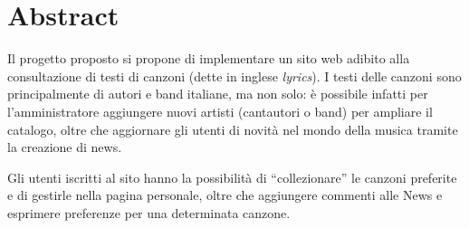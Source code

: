 \section{Abstract}
Il progetto proposto si propone di implementare un sito web adibito alla consultazione di testi di canzoni (dette in inglese \textit{lyrics}).
I testi delle canzoni sono principalmente di autori e band italiane, ma non solo: \`e possibile infatti per l'amministratore aggiungere nuovi artisti (cantautori o band) per ampliare il catalogo, oltre che aggiornare gli utenti di novit\`a nel mondo della musica tramite la creazione di news.

Gli utenti iscritti al sito hanno la possibilit\`a di ``collezionare'' le canzoni preferite e di gestirle nella pagina personale, oltre che aggiungere commenti alle News e esprimere preferenze per una determinata canzone.
